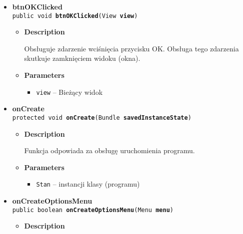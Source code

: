 \documentclass[11pt,a4paper]{article}
\begin{document}
{{{\begin{itemize}
{\begin{itemize}
{Obsługuje zdarzenie wciśnięcia przycisku Licencja - wyświetla licencję programu.
}
\item{
{\bf  Parameters}
  \begin{itemize}
   \item{
\texttt{view} -- Bieżący widok}
  \end{itemize}
}%
\end{itemize}
}%
\item{ 
\hypertarget{com.example.kostkadogry.About.btnOKClicked(View)}{{\bf  btnOKClicked}\\}
\texttt{public void\ {\bf  btnOKClicked}(\texttt{View} {\bf  view})
\label{com.example.kostkadogry.About.btnOKClicked(View)}}%
\begin{itemize}
\item{
{\bf  Description}

Obsługuje zdarzenie wciśnięcia przycisku OK. Obsługa tego zdarzenia skutkuje zamknięciem widoku (okna).
}
\item{
{\bf  Parameters}
  \begin{itemize}
   \item{
\texttt{view} -- Bieżący widok}
  \end{itemize}
}%
\end{itemize}
}%
\item{ 
\hypertarget{com.example.kostkadogry.About.onCreate(Bundle)}{{\bf  onCreate}\\}
\texttt{protected void\ {\bf  onCreate}(\texttt{Bundle} {\bf  savedInstanceState})
\label{com.example.kostkadogry.About.onCreate(Bundle)}}%
\begin{itemize}
\item{
{\bf  Description}

Funkcja odpowiada za obsługę uruchomienia programu.
}
\item{
{\bf  Parameters}
  \begin{itemize}
   \item{
\texttt{Stan} -- instancji klasy (programu)}
  \end{itemize}
}%
\end{itemize}
}%
\item{ 
\hypertarget{com.example.kostkadogry.About.onCreateOptionsMenu(Menu)}{{\bf  onCreateOptionsMenu}\\}
\texttt{public boolean\ {\bf  onCreateOptionsMenu}(\texttt{Menu} {\bf  menu})
\label{com.example.kostkadogry.About.onCreateOptionsMenu(Menu)}}%
\begin{itemize}
\item{
{\bf  Description}

}
\end{itemize}}
\end{itemize}}}}
\end{document}
